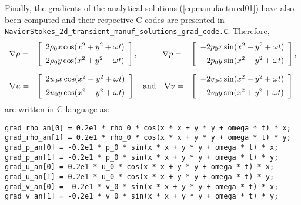 \documentclass[10pt]{article}
\begin{document}
Finally, the gradients of the analytical solutions (\ref{eq:manufactured01}) have also been computed and their respective C codes are presented in  \texttt{NavierStokes\_2d\_transient\_manuf\_solutions\_grad\_code.C}. Therefore,
\begin{equation}
\begin{array}{lll}
\nabla \rho =& \left[ \begin{array}{c}
 2  \rho_0 x \cos(x^2 + y^2 +\omega  t)  \vspace{5pt}\\
 2  \rho_0 y \cos(x^2 + y^2 + \omega  t) 
\end{array} \right],
\quad\qquad
\nabla p =& \left[ \begin{array}{c}
-2  p_0 x \sin(x^2 + y^2 + \omega  t)   \vspace{5pt}\\
 -2  p_0 y \sin(x^2 + y^2 + \omega  t) 
\end{array} \right], \vspace{10pt} \\
%
\nabla u =& \left[ \begin{array}{c}
 2  u_0 x \cos(x^2 + y^2 + \omega  t)  \vspace{5pt} \\
 2  u_0 y \cos(x^2 + y^2 + \omega  t) 
\end{array} \right]
\quad \mbox{and} \quad
\nabla v =& \left[ \begin{array}{c}
-2  v_0 x \sin(x^2 + y^2 + \omega  t) \vspace{5pt} \\
-2  v_0 y \sin(x^2 + y^2 + \omega  t)  
\end{array} \right]
\end{array}
\end{equation}
are written in C language as:
\begin{verbatim}
grad_rho_an[0] = 0.2e1 * rho_0 * cos(x * x + y * y + omega * t) * x;
grad_rho_an[1] = 0.2e1 * rho_0 * cos(x * x + y * y + omega * t) * y;
grad_p_an[0] = -0.2e1 * p_0 * sin(x * x + y * y + omega * t) * x;
grad_p_an[1] = -0.2e1 * p_0 * sin(x * x + y * y + omega * t) * y;
grad_u_an[0] = 0.2e1 * u_0 * cos(x * x + y * y + omega * t) * x;
grad_u_an[1] = 0.2e1 * u_0 * cos(x * x + y * y + omega * t) * y;
grad_v_an[0] = -0.2e1 * v_0 * sin(x * x + y * y + omega * t) * x;
grad_v_an[1] = -0.2e1 * v_0 * sin(x * x + y * y + omega * t) * y;
\end{verbatim}



 

\end{document}
